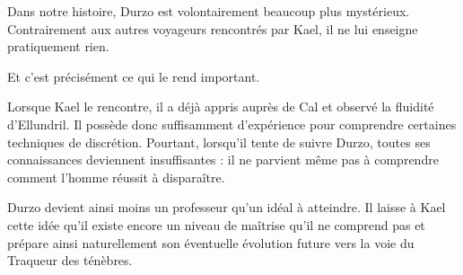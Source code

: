 Dans notre histoire, Durzo est volontairement beaucoup plus mystérieux.
Contrairement aux autres voyageurs rencontrés par Kael, il ne lui enseigne
pratiquement rien.

Et c'est précisément ce qui le rend important.

Lorsque Kael le rencontre, il a déjà appris auprès de Cal et observé la
fluidité d'Ellundril. Il possède donc suffisamment d'expérience pour
comprendre certaines techniques de discrétion. Pourtant, lorsqu'il tente de
suivre Durzo, toutes ses connaissances deviennent insuffisantes : il ne
parvient même pas à comprendre comment l'homme réussit à disparaître.

Durzo devient ainsi moins un professeur qu'un idéal à atteindre. Il laisse à
Kael cette idée qu'il existe encore un niveau de maîtrise qu'il ne comprend
pas et prépare ainsi naturellement son éventuelle évolution future vers la
voie du Traqueur des ténèbres.